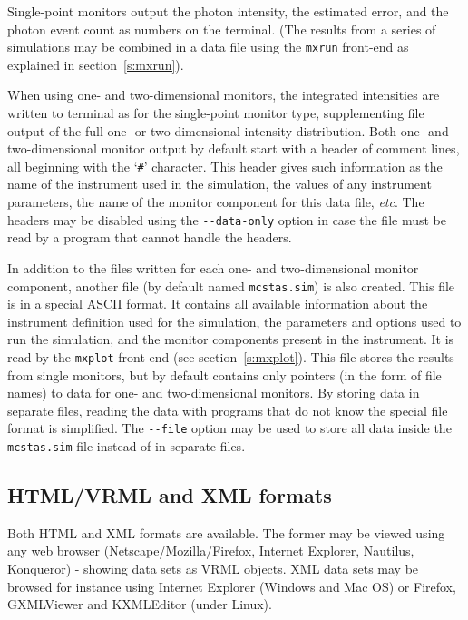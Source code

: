 Single-point monitors output the photon intensity, the estimated
error, and the photon event count as numbers on the
terminal. (The results from a series of simulations may be combined in a
data file using the \verb+mxrun+ front-end as explained in
section~\ref{s:mxrun}).

When using one- and two-dimensional monitors, the integrated
intensities are written to terminal as for the single-point monitor
type, supplementing file output of the full one- or two-dimensional
intensity distribution. Both one- and two-dimensional monitor output by default start with a
header of comment lines, all beginning with the `\verb+#+' character.
This header gives such information as the name of the instrument used in
the simulation, the values of any instrument parameters, the name of the
monitor component for this data file, \textit{etc}. The headers may be
disabled using the \verb+--data-only+ option in case the file must be
read by a program that cannot handle the headers.

In addition to the files written for each one- and two-dimensional
monitor component, another file (by default named \verb+mcstas.sim+) is
also created. This file is in a special \MCX ASCII format. It contains
all available information about the instrument definition used for the
simulation, the parameters and options used to run the simulation, and
the monitor components present in the instrument. It is read by the
\verb+mxplot+ front-end (see section~\ref{s:mxplot}). This file stores
the results from single monitors, but by default contains only pointers
(in the form of file names) to data for one- and two-dimensional
monitors. By storing data in separate files, reading the data with
programs that do not know the special \MCX file format is
simplified. The \verb+--file+ option may be used to store all data
inside the \verb+mcstas.sim+ file instead of in separate files.

\subsection{HTML/VRML and XML formats}
  

Both HTML and XML formats are available. The former may be viewed using any web browser (Netscape/Mozilla/Firefox, Internet Explorer, Nautilus, Konqueror) - showing data sets as VRML objects. XML data sets may be browsed for instance using Internet Explorer (Windows and Mac OS) or Firefox, GXMLViewer and KXMLEditor (under Linux).

